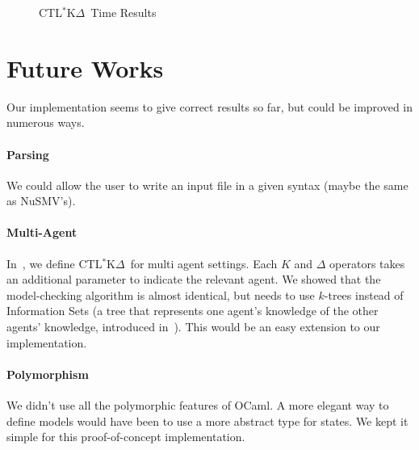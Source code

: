 \documentclass[dvipsnames]{acmart}
\def\ctlskd{CTL$^{*}$K$\Delta$}
\def\K{\mathit{K}}
\begin{document}
\begin{figure}
  \caption{\ctlskd\ Time Results}
  \label{time_ctlskd}
\end{figure}

\section{Future Works}
Our implementation seems to give correct results so far, but could be improved in numerous ways.

\paragraph{Parsing}
We could allow the user to write an input file in a given syntax (maybe the same as NuSMV's).

\paragraph{Multi-Agent}
In~\cite{KR18}, we define \ctlskd\ for multi agent settings. Each $\K$ and $\Delta$ operators takes an additional parameter to indicate the relevant agent.
We showed that the model-checking algorithm is almost identical, but needs to use $k$-trees instead of Information Sets (a tree that represents one agent's knowledge of the other agents' knowledge, introduced in~\cite{ktrees}).
This would be an easy extension to our implementation.

\paragraph{Polymorphism}
We didn't use all the polymorphic features of OCaml. A more elegant way to define models would have been to use a more abstract type for states. We kept it simple for this proof-of-concept implementation.
\end{document}
